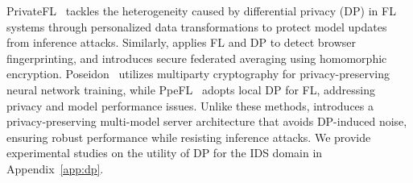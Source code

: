  PrivateFL~\cite{yang2023privatefl} tackles the heterogeneity caused by differential privacy (DP) in FL systems through personalized data transformations to protect model updates from inference attacks. Similarly, \cite{annamalai2023fp} applies FL and DP to detect browser fingerprinting, and \cite{dasu2022prov} introduces secure federated averaging using homomorphic encryption. Poseidon~\cite{sav2020poseidon} utilizes multiparty cryptography for privacy-preserving neural network training, while PpeFL~\cite{wang2023ppefl} adopts local DP for FL, addressing privacy and model performance issues. Unlike these methods, \Sys introduces a privacy-preserving multi-model server architecture that avoids DP-induced noise, ensuring robust performance while resisting inference attacks. We provide experimental studies on the utility of DP for the IDS domain in Appendix~\ref{app:dp}.











